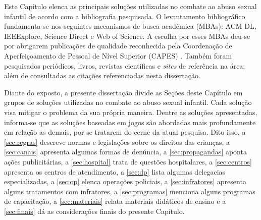 Este Capítulo elenca as principais soluções utilizadas no combate ao abuso sexual infantil de acordo com a bibliografia pesquisada. O levantamento bibliográfico fundamenta-se nos seguintes mecanismos de busca acadêmica (MBAs): ACM DL, IEEExplore, Science Direct e Web of Science. A escolha por esses MBAs deu-se por abrigarem publicações de qualidade reconhecida pela Coordenação de Aperfeiçoamento de Pessoal de Nível Superior (CAPES) \cite{capes2016}%
. Também foram pesquisados periódicos, livros, revistas científicas e \textit{sites} de referência na área; além de consultadas as citações referenciadas nesta dissertação. 

Diante do exposto, a presente dissertação divide as Seções deste Capítulo em grupos de soluções utilizadas no combate ao abuso sexual infantil. Cada solução visa mitigar o problema da sua própria maneira. Dentre as soluções apresentadas, informa-se que as soluções baseadas em jogos são abordadas mais profundamente em relação as demais, por se tratarem do cerne da atual pesquisa. Dito isso, a \autoref{sec:regras} descreve normas e legislações sobre os direitos das crianças, a \autoref{sec:canais} apresenta algumas formas de denúncia, a \autoref{sec:propagandas} aponta ações publicitárias, a \autoref{sec:hospital} trata de questões hospitalares, a \autoref{sec:centros} apresenta os centros de atendimento, a \autoref{sec:dp} lista algumas delegacias especializadas, a \autoref{sec:op} elenca operações policiais, a \autoref{sec:infratores} apresenta alguns tratamentos com infratores, a \autoref{sec:programas} menciona alguns programas de capacitação, a \autoref{sec:materiais} relata materiais didáticos de ensino e a \autoref{sec:finais} dá as considerações finais do presente Capítulo. 











